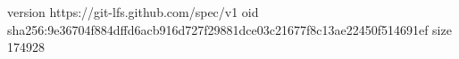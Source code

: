 version https://git-lfs.github.com/spec/v1
oid sha256:9e36704f884dffd6acb916d727f29881dce03c21677f8c13ae22450f514691ef
size 174928
